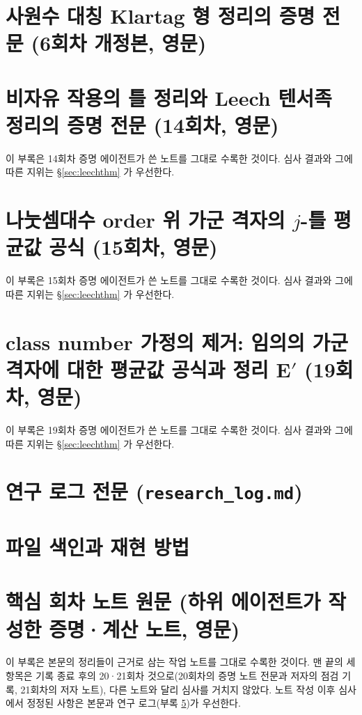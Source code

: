 \section{사원수 대칭 Klartag 형 정리의 증명 전문 (6회차 개정본, 영문)}\label{app:proof}
{\small\sloppy

}
\section{비자유 작용의 틀 정리와 Leech 텐서족 정리의 증명 전문 (14회차, 영문)}\label{app:proof14}
이 부록은 14회차 증명 에이전트가 쓴 노트를 그대로 수록한 것이다. 심사 결과와 그에 따른 지위는 \S\ref{sec:leechthm} 가 우선한다.
{\small\sloppy

}
\section{나눗셈대수 order 위 가군 격자의 $j$-틀 평균값 공식 (15회차, 영문)}\label{app:proof15}
이 부록은 15회차 증명 에이전트가 쓴 노트를 그대로 수록한 것이다. 심사 결과와 그에 따른 지위는 \S\ref{sec:leechthm} 가 우선한다.
{\small\sloppy

}
\section{class number 가정의 제거: 임의의 가군 격자에 대한 평균값 공식과 정리 E$'$ (19회차, 영문)}\label{app:proof19}
이 부록은 19회차 증명 에이전트가 쓴 노트를 그대로 수록한 것이다. 심사 결과와 그에 따른 지위는 \S\ref{sec:leechthm} 가 우선한다.
{\small\sloppy

}
\section{연구 로그 전문 (\texttt{research\_log.md})}\label{app:log}
{\small\sloppy

}
\section{파일 색인과 재현 방법}\label{app:files}

\section{핵심 회차 노트 원문 (하위 에이전트가 작성한 증명·계산 노트, 영문)}\label{app:notes}
이 부록은 본문의 정리들이 근거로 삼는 작업 노트를 그대로 수록한 것이다. 맨 끝의 세 항목은 기록 종료 후의 20·21회차 것으로(20회차의 증명 노트 전문과 저자의 점검 기록, 21회차의 저자 노트), 다른 노트와 달리 심사를 거치지 않았다. 노트 작성 이후 심사에서 정정된 사항은 본문과 연구 로그(부록 \ref{app:log})가 우선한다.
{\footnotesize\sloppy

}


